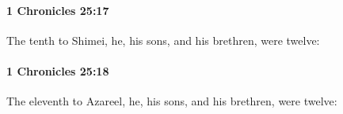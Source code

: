 		\paragraph{1 Chronicles 25:17} %
			\label{1CHRONICLES-25-17}

			The tenth to Shimei, he, his sons, and his brethren, were twelve:


		\paragraph{1 Chronicles 25:18} %
			\label{1CHRONICLES-25-18}

			The eleventh to Azareel, he, his sons, and his brethren, were twelve:


